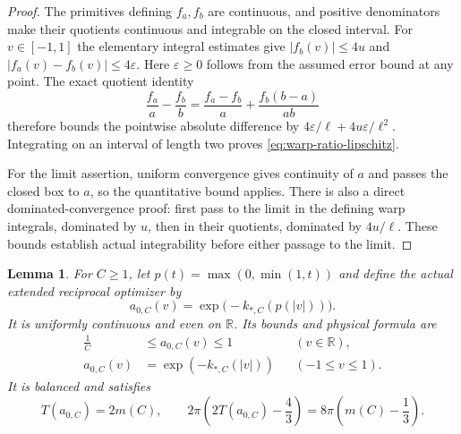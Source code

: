 \documentclass[11pt]{article}
\newtheorem{lemma}[theorem]{Lemma}
\newcommand{\R}{\mathbb R}
\begin{document}
\begin{proof}
The primitives defining $f_a,f_b$ are continuous, and positive denominators
make their quotients continuous and integrable on the closed interval.
For $v\in[-1,1]$ the elementary integral estimates give
$|f_b(v)|\leq4u$ and $|f_a(v)-f_b(v)|\leq4\varepsilon$.
Here $\varepsilon\geq0$ follows from the assumed error bound at any point.
The exact quotient identity
\[
 \frac{f_a}{a}-\frac{f_b}{b}
 =\frac{f_a-f_b}{a}+\frac{f_b(b-a)}{ab}
\]
therefore bounds the pointwise absolute difference by
$4\varepsilon/\ell+4u\varepsilon/\ell^2$.
Integrating on an interval of length two proves
\eqref{eq:warp-ratio-lipschitz}.

For the limit assertion, uniform convergence gives continuity of $a$ and
passes the closed box to $a$, so the quantitative bound applies.
There is also a direct dominated-convergence proof: first pass to the limit
in the defining warp integrals, dominated by $u$, then in their quotients,
dominated by $4u/\ell$. These bounds establish actual integrability before
either passage to the limit.
\end{proof}

\begin{lemma}\label{lem:continuous-reciprocal-limit}
For $C\geq1$, let $p(t)=\max(0,\min(1,t))$ and define the actual extended
reciprocal optimizer by
\begin{equation}\label{eq:even-reciprocal-limit}
 a_{0,C}(v)=\exp\bigl(-k_{*,C}(p(|v|))\bigr).
\end{equation}
It is uniformly continuous and even on $\R$. Its bounds and physical formula are
\[
 \begin{aligned}
 \frac1C&\leq a_{0,C}(v)\leq1&&(v\in\R),\\
 a_{0,C}(v)&=\exp(-k_{*,C}(|v|))&&(-1\leq v\leq1).
 \end{aligned}
\]
It is balanced and satisfies
\begin{equation}\label{eq:reciprocal-limit-integral}
 T(a_{0,C})=2m(C),\qquad
 2\pi\left(2T(a_{0,C})-\frac43\right)
       =8\pi\left(m(C)-\frac13\right).
\end{equation}
\end{lemma}
\end{document}
